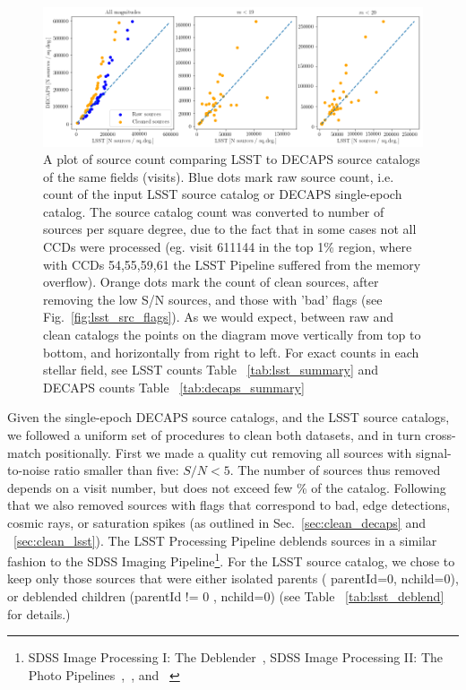 \documentclass[DM,lsstdraft,toc,usenatbib]{lsstdoc}
\begin{document}
\begin{figure}
\begin{centering}
\includegraphics[width=0.9\columnwidth]{figs/decaps_lsst_source_count.png}
\caption{A plot of source count comparing LSST to DECAPS source catalogs of the same fields (visits). Blue dots mark raw source count, i.e. count of the input LSST  source catalog or DECAPS single-epoch catalog. The source catalog count was converted to number of sources per square degree, due to the fact that in some cases not all CCDs were processed (eg. visit 611144 in the top 1\% region, where with CCDs 54,55,59,61 the LSST Pipeline suffered from the memory overflow).  Orange dots mark the count of clean sources, after removing the low S/N sources,  and those with 'bad' flags (see Fig.~\ref{fig:lsst_src_flags}). As we would expect, between raw and clean catalogs the points on the diagram move vertically from top to bottom, and horizontally from right to left. For exact counts in each stellar field, see LSST counts Table ~\ref{tab:lsst_summary} and DECAPS counts Table ~\ref{tab:decaps_summary}}
\label{fig:lsst_count_comparison}
\end{centering}
\end{figure} 


Given the single-epoch DECAPS source catalogs, and the LSST source catalogs, we followed a uniform set of procedures to clean both datasets, and in turn cross-match positionally. First we made a quality cut removing all sources with signal-to-noise ratio smaller than five:  $S/N < 5$. The number of sources thus removed depends on a visit number, but does not exceed few \% of the catalog. Following that we also removed sources with flags that correspond to bad, edge detections, cosmic rays, or saturation spikes (as outlined in Sec.~\ref{sec:clean_decaps} and ~\ref{sec:clean_lsst}). The LSST Processing Pipeline deblends sources in a similar fashion to the SDSS Imaging Pipeline\footnote{SDSS Image Processing I: The Deblender~\citep{lupton2005}, SDSS Image Processing II: The Photo Pipelines~\citep{lupton2001},~\citep{lupton2002}, and ~\citep{lupton2005a}}.   For the LSST source catalog,  we chose to keep only those sources that were either isolated parents ( parentId=0, nchild=0), or deblended children (parentId != 0 , nchild=0) (see Table ~\ref{tab:lsst_deblend} for details.)
\end{document}
